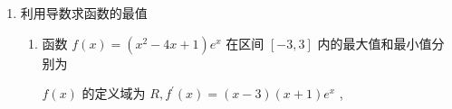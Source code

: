 \begin{enumerate}
\begin{enumerate}
\begin{jieda}
            则 $\left\{  \begin{matrix} \Delta  = 4 - {4a} > 0 \\  {x}_{1} + {x}_{2} = \dfrac{2}{a} > 0 \\  {x}_{1}{x}_{2} = \dfrac{1}{a} > 0 \end{matrix}\right.$ ，解得 $0 < a < 1$ ，且 ${x}_{1} + {x}_{2} = 2{x}_{1}{x}_{2}$ .
            
            由 $f\left( {x}_{1}\right)  + f\left( {x}_{2}\right)  + {x}_{1}{x}_{2} = \dfrac{1}{2}a{x}_{1}^{2} - 2{x}_{1} + \ln {x}_{1} + \dfrac{1}{2}a{x}_{2}^{2} - 2{x}_{2} + \ln {x}_{2} + {x}_{1}{x}_{2}$
            
            $= \dfrac{1}{2}\left( {2{x}_{1} - 1 + 2{x}_{2} - 1}\right)  - 2\left( {{x}_{1} + {x}_{2}}\right)  + \ln \left( {{x}_{1}{x}_{2}}\right)  + {x}_{1}{x}_{2}$
            
            $=  - \left( {{x}_{1} + {x}_{2}}\right)  + \ln {x}_{1}{x}_{2} + {x}_{1}{x}_{2} - 1$
            
            $=  - {x}_{1}{x}_{2} + \ln {x}_{1}{x}_{2} - 1 =  - \dfrac{1}{a} + \ln \dfrac{1}{a} - 1$ ,
            
            令 $t = \dfrac{1}{a},t > 1$ ,则 $g\left( t\right)  = \ln t - t - 1,t > 1$ ,
            
            由 ${g}^{\prime }\left( t\right)  = \dfrac{1}{t} - 1 < 0$ ,故 $g\left( t\right)$ 在 $\left( {1, + \infty }\right)$ 单调递减,故 $g\left( t\right)  < g\left( 1\right)  =  - 2$ ,
            
            要使 $m > f\left( {x}_{1}\right)  + f\left( {x}_{2}\right)  + {x}_{1}{x}_{2}$ 恒成立,即 $m > g\left( t\right)$ 恒成立,
            
            则 $m \geq   - 2$ ，则实数 $m$ 的取值范围是 $\lbrack  - 2, + \infty )$ .
        \end{jieda}
    \end{enumerate}

    \item 利用导数求函数的最值
    \begin{enumerate}
        \item 函数 $f\left( x\right)  = \left( {{x}^{2} - {4x} + 1}\right) {{e}}^{x}$ 在区间 $\left\lbrack  {-3,3}\right\rbrack$ 内的最大值和最小值分别为
        \begin{jieda}
            $f\left( x\right)$ 的定义域为 $R,{f}^{\prime }\left( x\right)  = \left( {x - 3}\right) \left( {x + 1}\right) {{e}}^{x}$ ,
            

\end{jieda}
\end{enumerate}
\end{enumerate}
